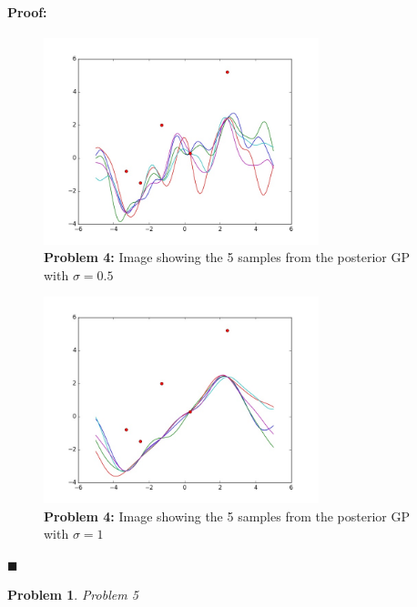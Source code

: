 \documentclass[12pt]{article}
\newenvironment{proof}{\paragraph{Proof: }}{\hfill$\blacksquare$}
\newtheorem{problem}{Problem}%
\begin{document}
\begin{proof}
\begin{enumerate}
\begin{enumerate}
		\begin{figure}[!htbp]
\centering
\includegraphics[width=8cm]{hw_p4_05.jpg}
\caption{\textbf{Problem 4:} Image showing the  5 samples from the posterior GP with $\sigma = 0.5$}
\end{figure}

		\begin{figure}[!htbp]
\centering
\includegraphics[width=8cm]{hw_p4_1.jpg}
\caption{\textbf{Problem 4:} Image showing the  5 samples from the posterior GP with $\sigma = 1$}
\end{figure}
\end{enumerate}

\end{enumerate}
\end{proof}

\begin{problem}
\normalfont
Problem 5
\end{problem}
\end{document}
